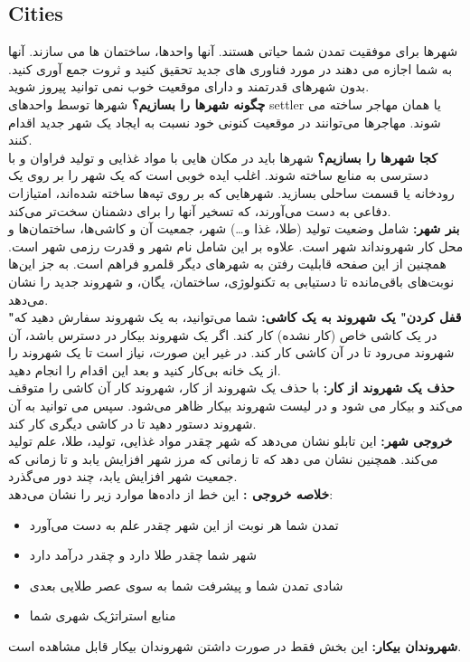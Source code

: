 \documentclass[]{article}
\begin{document}
\subsection*{{\titr Cities}}
شهرها برای موفقیت تمدن شما حیاتی هستند. آنها واحدها، ساختمان ها می سازند. آنها به شما اجازه می دهند در مورد فناوری های جدید تحقیق کنید و ثروت جمع آوری کنید. بدون شهرهای قدرتمند و دارای موقعیت خوب نمی توانید پیروز شوید.
\\\noindent \textbf{چگونه شهر‌ها را بسازیم؟}
شهرها توسط واحدهای settler یا همان مهاجر ساخته می شوند. مهاجرها می‌توانند در موقعیت کنونی خود نسبت به ایجاد یک شهر جدید اقدام کنند.
\\\noindent \textbf{کجا شهرها را بسازیم؟}
شهرها باید در مکان هایی با مواد غذایی و تولید فراوان و با دسترسی به منابع ساخته شوند. اغلب ایده خوبی است که یک شهر را بر روی یک رودخانه یا قسمت ساحلی بسازید. شهرهایی که بر روی تپه‌ها ساخته شده‌اند، امتیازات دفاعی به دست می‌آورند، که تسخیر آنها را برای دشمنان سخت‌تر می‌کند.
\\\noindent \textbf{بنر شهر:}
شامل وضعیت تولید (طلا، غذا و…) شهر، جمعیت آن  و کاشی‌ها، ساختمان‌ها و محل کار شهرونداند شهر است. علاوه بر این شامل نام شهر و قدرت رزمی شهر است. همچنین از این صفحه قابلیت رفتن به شهرهای دیگر قلمرو فراهم است. به جز این‌ها نوبت‌های باقی‌مانده تا دستیابی به تکنولوژی، ساختمان، یگان، و شهروند جدید را نشان می‌دهد.
\\\noindent \textbf{"قفل کردن" یک شهروند به یک کاشی:}
شما می‌توانید، به یک شهروند سفارش دهید که در یک کاشی خاص (کار نشده) کار کند. اگر یک شهروند بیکار در دسترس باشد، آن شهروند می‌رود تا در آن کاشی کار کند. در غیر این صورت، نیاز است تا یک شهروند را از یک خانه بی‌کار کنید و بعد این اقدام را انجام دهید.
\\\noindent \textbf{حذف یک شهروند از کار:}
با حذف یک شهروند از کار، شهروند کار آن کاشی را متوقف می‌کند و بیکار می شود و در لیست شهروند بیکار ظاهر می‌شود. سپس می توانید به آن شهروند دستور دهید تا در کاشی دیگری کار کند.
\\\noindent \textbf{خروجی شهر:}
این تابلو نشان می‌دهد که شهر چقدر مواد غذایی، تولید، طلا، علم تولید می‌کند. همچنین نشان می دهد که تا زمانی که مرز شهر افزایش یابد و تا زمانی که جمعیت شهر افزایش یابد، چند دور می‌گذرد.
\\\noindent \textbf{خلاصه خروجی :}
این خط از داده‌ها موارد زیر را نشان می‌دهد:
\begin{itemize}
	\item تمدن شما هر نوبت از این شهر چقدر علم به دست می‌آورد
	\item شهر شما چقدر طلا دارد و چقدر درآمد دارد
	\item شادی تمدن شما و پیشرفت شما به سوی عصر طلایی بعدی
	\item منابع استراتژیک شهری شما
\end{itemize}
\noindent \textbf{شهروندان بیکار:} این بخش فقط در صورت داشتن شهروندان بیکار قابل مشاهده است.
\end{document}

